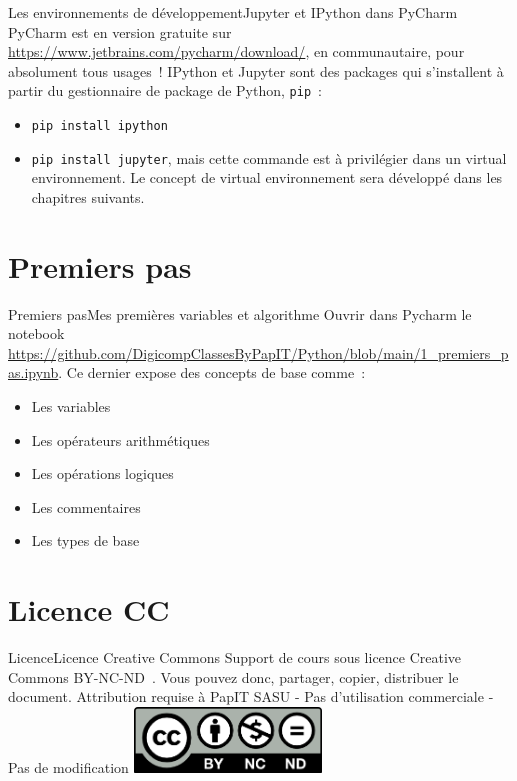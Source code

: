 \documentclass{beamer}
\begin{document}
    \begin{frame}{Les environnements de développement}{Jupyter et IPython dans PyCharm}
        PyCharm est en version gratuite sur \url{https://www.jetbrains.com/pycharm/download/}, en communautaire, pour absolument tous usages~!
        \bigbreak
        IPython et Jupyter sont des packages qui s'installent à partir du gestionnaire de package de Python, \lstinline{pip}~:
        \begin{itemize}
            \item \lstinline{pip install ipython}
            \item \lstinline{pip install jupyter}, mais cette commande est à privilégier dans un virtual environnement.
            Le concept de virtual environnement sera développé dans les chapitres suivants.
        \end{itemize}
    \end{frame}


    \section{Premiers pas}\label{sec:first-steps}
    \begin{frame}{Premiers pas}{Mes premières variables et algorithme}
        Ouvrir dans Pycharm le notebook \url{https://github.com/DigicompClassesByPapIT/Python/blob/main/1_premiers_pas.ipynb}.
        \bigbreak
        Ce dernier expose des concepts de base comme~:
        \begin{itemize}
            \item Les variables
            \item Les opérateurs arithmétiques
            \item Les opérations logiques
            \item Les commentaires
            \item Les types de base
        \end{itemize}
    \end{frame}


    \section{Licence CC}\label{sec:licence}

    \begin{frame}{Licence}{Licence Creative Commons}
        Support de cours sous licence Creative Commons BY-NC-ND~.
        \bigbreak
        Vous pouvez donc, partager, copier, distribuer le document.
        \bigbreak
        Attribution requise à PapIT SASU - Pas d’utilisation commerciale - Pas de modification
        \bigbreak
        \centering
        \includegraphics[width=5cm]{image/by-nc-nd-logo}
    \end{frame}
\end{document}
